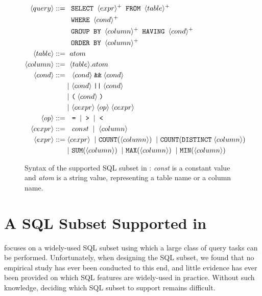 \begin{figure}[t]
\footnotesize%
\begin{align*}
\q ::= {} 
	& \texttt{ SELECT } \e^+ \texttt{ FROM } \dbtable^+ \\
        & \texttt{ WHERE } \cond^+ \\ 
	&  \texttt{ GROUP BY } \column^+ \texttt{ HAVING } \cond^+\\
	&  \texttt{ ORDER BY } \column^+ \\
\dbtable::= {} &\ atom \\
\column ::= {} &\ \dbtable.atom\\
\cond ::= {} &\ \ \cond \;\texttt{\&\&}\; \cond \\ 
    & |\ \cond \;\texttt{||}\; \cond \\
    & |\ \texttt{(}\;\cond\;\texttt{)} \\
    & |\ \ce \;\op\; \ce \\
\op ::= {} &\ \ \texttt{=} \;\;|\;\; \texttt{>}  \;\;|\;\; \texttt{<}\\
\ce ::= {} &\ \ const \;\;|\;\; \column  \;\; \\
\e ::= {} & \ce \;\;|\ \texttt{COUNT}(\column) \;\;|\ \texttt{COUNT}(\texttt{DISTINCT}\;\column)\\
    & |\ \texttt{SUM}(\column) \;\;|\ \texttt{MAX}(\column) \;\;|\ \texttt{MIN}(\column) 
\end{align*}
\normalsize%
\caption{Syntax of the supported SQL subset in \ourtool:
\textit{const} is a constant value and
\textit{atom} is a string value, representing
a table name or a column name.
}
\label{fig:syntax}
\end{figure}


\section{A SQL Subset Supported in \ourtool}
\label{sec:langsubset}

\ourtool focuses on a widely-used SQL subset
using which a large class of query tasks can be performed.
Unfortunately, when designing the SQL
subset, we found that no empirical
study has ever been conducted to this end,
and little evidence has ever been provided
on which SQL features are widely-used in practice.
Without such knowledge, deciding which
SQL subset to support remains difficult.



